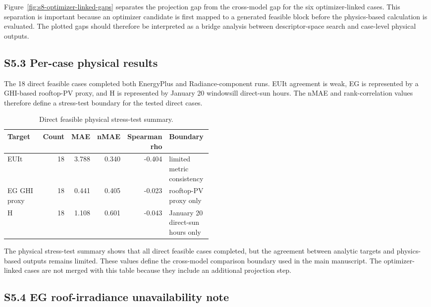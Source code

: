 \documentclass[11pt]{article}
\begin{document}
Figure~\ref{fig:s8-optimizer-linked-gaps} separates the projection gap from the cross-model gap for the six optimizer-linked cases. This separation is important because an optimizer candidate is first mapped to a generated feasible block before the physics-based calculation is evaluated. The plotted gaps should therefore be interpreted as a bridge analysis between descriptor-space search and case-level physical outputs.

\subsection*{S5.3 Per-case physical results}

The 18 direct feasible cases completed both EnergyPlus and Radiance-component runs. EUIt agreement is weak, EG is represented by a GHI-based rooftop-PV proxy, and H is represented by January 20 windowsill direct-sun hours. The nMAE and rank-correlation values therefore define a stress-test boundary for the tested direct cases.

\begin{table}[H]
\caption{Direct feasible physical stress-test summary.}
\label{tab:s-physical-summary}
\centering
\footnotesize
\begin{tabularx}{\linewidth}{@{}p{0.25\linewidth}rrrrp{0.23\linewidth}@{}}
\toprule
Target & Count & MAE & nMAE & Spearman rho & Boundary \\
\midrule
EUIt & 18 & 3.788 & 0.340 & -0.404 & limited metric consistency \\
EG GHI proxy & 18 & 0.441 & 0.405 & -0.023 & rooftop-PV proxy only \\
H & 18 & 1.108 & 0.601 & -0.043 & January 20 direct-sun hours only \\
\bottomrule
\end{tabularx}
\end{table}

The physical stress-test summary shows that all direct feasible cases completed, but the agreement between analytic targets and physics-based outputs remains limited. These values define the cross-model comparison boundary used in the main manuscript. The optimizer-linked cases are not merged with this table because they include an additional projection step.

\subsection*{S5.4 EG roof-irradiance unavailability note}
\end{document}
